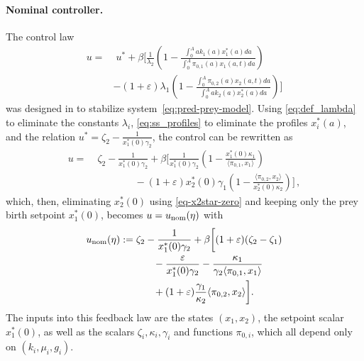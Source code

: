 \documentclass[journal,twoside,web]{ieeecolor}
\begin{document}
\paragraph*{Nominal controller.} 
The control law
\begin{align}
  \nonumber   u =&\;  u^* + \beta \Bigg[
    \frac{1}{\lambda_2}
    \left(1 - \frac{\int_0^A a k_1(a) x_1^*(a) da}{\int_0^A \pi_{0,1}(a) x_1(a,t)  d a} \right)  
    \\ &- (1+\varepsilon)\lambda_1\left(1 - \frac{\int_0^A \pi_{0,2}(a) x_2(a,t) d a}
    {\int_0^A a k_2(a) x_2^*(a) da} \right)
    \Bigg] 
\end{align}
was designed in \cite{veil2025stabilization} to stabilize system~\eqref{eq:pred-prey-model}.
Using \eqref{eq:def_lambda} to eliminate the constants $\lambda_i$, \eqref{eq:ss_profiles} to eliminate the profiles $x_i^*(a)$, and the relation $u^* = \zeta_2 - \frac{1}{x_1^*(0)\gamma_2}$, the control can be rewritten as
\begin{align}
u =&\; \zeta_2 - \frac{1}{x_1^*(0)\gamma_2}
+ \beta\bigg[\frac{1}{x_1^*(0)\gamma_2}\left(1 - \frac{x_1^*(0)\kappa_1}{\langle\pi_{0,1}, x_1\rangle}\right) \nonumber \\ & \qquad \qquad - (1+\varepsilon)x_2^*(0)\gamma_1\left(1 - \frac{\langle\pi_{0,2}, x_2\rangle}{x_2^*(0)\kappa_2}\right)\bigg]\,,
\end{align}
which, then, eliminating $x_2^*(0)$ using \eqref{eq-x2star-zero} and keeping only the prey birth setpoint $x_1^*(0)$, becomes $u = u_{\rm nom}(\eta)$ with
\begin{align}
u_{\rm nom}(\eta)
:=&\; \zeta_2 - \frac{1}{x_1^*(0)\gamma_2}
+ \beta\bigg[
(1+\varepsilon)(\zeta_2-\zeta_1)
\nonumber \\ &  \qquad -\frac{\varepsilon}{x_1^*(0)\gamma_2}
-\frac{\kappa_1}{\gamma_2\langle\pi_{0,1},x_1\rangle}
\nonumber \\ &  \qquad +(1+\varepsilon)\frac{\gamma_1}{\kappa_2}\langle\pi_{0,2},x_2\rangle
\bigg]. \label{eq:nominal-control-law}
\end{align}
The inputs into this feedback law are the states $(x_1,x_2)$, the setpoint scalar $x_1^*(0)$, as well as the scalars $\zeta_i,\kappa_i,\gamma_i$ and functions $\pi_{0,i}$, which all depend only on $(k_i,\mu_i, g_i)$. 
\end{document}
